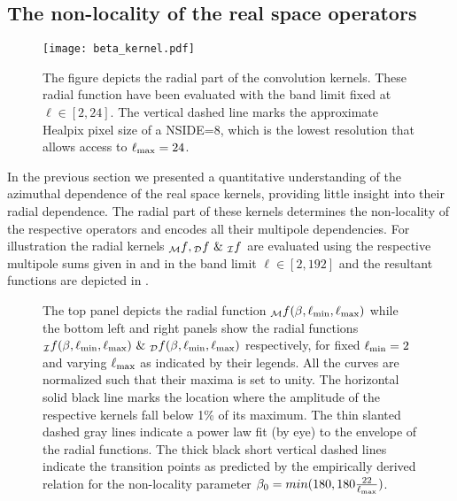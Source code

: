 \subsection{The non-locality of the real space operators} \label{sec:radial_locality}
%
\begin{figure}[t]
\centering
\texttt{[image: beta\_kernel.pdf]}
\caption{The figure depicts the radial part of the convolution kernels. These radial function have been evaluated with the band limit fixed at $\ell \in [2,24]$. The vertical dashed line marks the approximate Healpix pixel size of a NSIDE=8, which is the lowest resolution that allows access to $\ell_{\rm max}=24$.}
\label{fig:beta_kernel}
\end{figure}
%
In the previous section we presented a quantitative understanding of the  azimuthal dependence of the real space kernels, providing little insight into their radial dependence. The radial part of these kernels determines the non-locality of the respective operators and encodes all their multipole dependencies. For illustration the radial kernels ${_{\mathcal{M}}f}, {_{\mathcal{D}}f} ~\&~ {_{\mathcal{I}}f} $ are evaluated using the respective multipole sums given in  and  in the band limit $\ell \in [2,192]$ and the resultant functions are depicted in . 
%
\begin{figure}[t]
\centering
{}
\caption{The top panel depicts the radial function  ${_{\mathcal{M}}f}(\beta,\ell_{\rm min},\ell_{\rm max})$ while the bottom left and right panels show the radial functions ${}_{\mathcal{I}}f(\beta,\ell_{\rm min},\ell_{\rm max}) ~\&~ {}_{\mathcal{D}}f(\beta,\ell_{\rm min},\ell_{\rm max})$ respectively, for fixed $\ell_{\rm min}=2$ and varying $\ell_{\rm max}$ as indicated by their legends. All the curves are normalized such that their maxima is set to unity. The horizontal solid black line marks the location where the amplitude of the respective kernels fall below 1\% of its maximum. The thin slanted dashed gray lines indicate a power law fit (by eye) to the envelope of the radial functions. The thick black short vertical dashed lines indicate the transition points as predicted by the empirically derived relation for the non-locality parameter $\beta_0=min(180,180 \frac{22}{\ell_{\rm max}})$.}
\label{fig:rad_ker_decay}
\end{figure}
%

